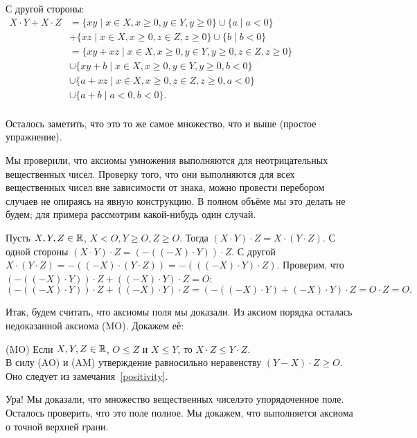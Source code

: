 \documentclass[a4paper,12pt]{article}
\begin{document}
\begin{items}{-3}
С другой стороны:\\
$
\begin{aligned}
X\cdot Y + X\cdot Z &= \{x y \mid x\in X, x \ge 0, y \in Y, y\ge 0\} \cup \{a \mid a<0\} \\
&+ \{x z \mid x\in X, x \ge 0, z \in Z, z\ge 0\} \cup \{b \mid b<0\}\\
&= \{xy+xz \mid x\in X, x \ge 0, y\in Y, y\ge 0, z\in Z, z\ge 0\} \\
&\cup \{xy+b \mid x\in X, x \ge 0, y\in Y, y\ge 0, b < 0\} \\
&\cup \{a+xz \mid x\in X, x \ge 0, z\in Z, z\ge 0, a < 0\} \\
&\cup \{a+b \mid a < 0, b < 0\}. \\
\end{aligned}
$

Осталось заметить, что это то же самое множество, что и выше (простое упражнение).
\end{items}

\bigskip
Мы проверили, что аксиомы умножения выполняются для неотрицательных вещественных чисел. Проверку того, что они выполняются для всех вещественных чисел вне зависимости от знака, можно провести перебором случаев не опираясь на явную конструкцию. В полном объёме мы это делать не будем; для примера рассмотрим какой-нибудь один случай.

Пусть $X,Y,Z\in \mathbb{R}$, $X < O, Y\ge O, Z\ge O$. Тогда $(X\cdot Y)\cdot Z=X\cdot (Y\cdot Z)$.
С одной стороны $(X\cdot Y)\cdot Z = (-((-X)\cdot Y))\cdot Z$. С другой $X\cdot (Y\cdot Z) = -((-X)\cdot (Y\cdot Z)) = -(((-X)\cdot Y)\cdot Z)$. Проверим, что $(-((-X)\cdot Y))\cdot Z + ((-X)\cdot Y)\cdot Z = O$:\\
$
(-((-X)\cdot Y))\cdot Z + ((-X)\cdot Y)\cdot Z =
(-((-X)\cdot Y) + (-X)\cdot Y)\cdot Z = O\cdot Z = O.
$

\bigskip
Итак, будем считать, что аксиомы поля мы доказали. Из аксиом порядка осталась недоказанной аксиома (MO). Докажем её:
\begin{items}{-3}
\item[(MO)]
Если $X,Y,Z\in \mathbb{R}$, $O\le Z$ и $X\le Y$, то $X\cdot Z\le Y\cdot Z$.\\
В силу (AO) и (AM) утверждение равносильно неравенству $(Y-X)\cdot Z \ge O$. Оно следует из замечания~\ref{positivity}.
\end{items}

\bigskip
Ура! Мы доказали, что множество вещественных чисел\т это упорядоченное поле. Осталось проверить, что это поле полное. Мы докажем, что выполняется аксиома о точной верхней грани.
\end{document}
